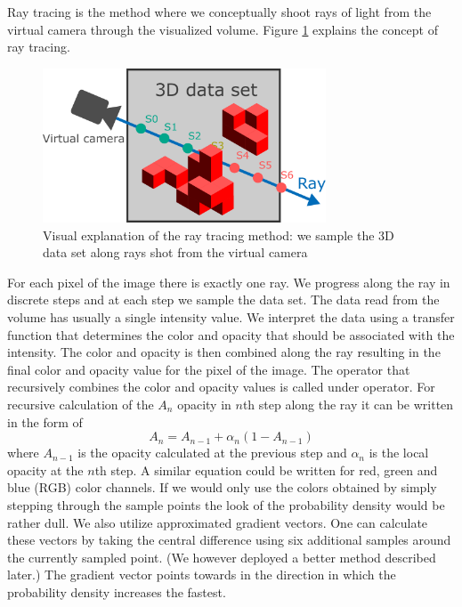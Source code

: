 Ray tracing is the method where we conceptually shoot rays of light from the virtual camera through the visualized volume.
Figure \ref{fig:ray_tracing_method} explains the concept of ray tracing.
\begin{figure}
	\centering
	\includegraphics[width=0.75\textwidth]{figures/ray_tracing_visualization.pdf}
	\caption{Visual explanation of the ray tracing method: we sample the 3D data set along rays shot from the virtual camera}
	\label{fig:ray_tracing_method}
\end{figure}
For each pixel of the image there is exactly one ray.
We progress along the ray in discrete steps and at each step we sample the data set.
The data read from the volume has usually a single intensity value.
We interpret the data using a transfer function that determines the color and opacity that should be associated with the intensity.
The color and opacity is then combined along the ray resulting in the final color and opacity value for the pixel of the image.
The operator that recursively combines the color and opacity values is called under operator. For recursive calculation of the $A_n$ opacity in $n$th step along the ray it can be written in the form of
\begin{equation}
	\label{eq:under_op}
	A_n = A_{n-1} + \alpha_n(1 - A_{n-1})
\end{equation}
where $A_{n-1}$ is the opacity calculated at the previous step and $\alpha_n$ is the local opacity at the $n$th step.
A similar equation could be written for red, green and blue (RGB) color channels.
If we would only use the colors obtained by simply stepping through the sample points the look of the probability density would be rather dull.
We also utilize approximated gradient vectors.
One can calculate these vectors by taking the central difference using six additional samples around the currently sampled point.
(We however deployed a better method described later.)
The gradient vector points towards in the direction in which the probability density increases the fastest.
